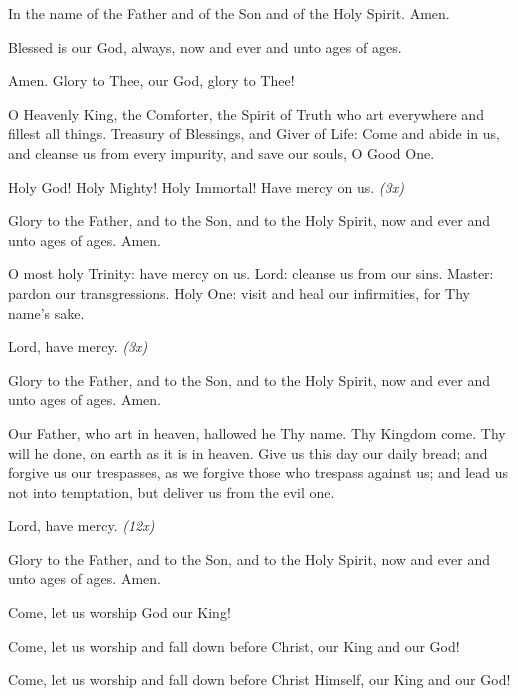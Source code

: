\begin{center}
\end{center}

In the name of the Father and of the Son and of the Holy Spirit. Amen.

\begin{hang}
\noindent{}Blessed is our God, always, now and ever and unto ages of ages.

\end{hang}

\begin{hang}
\noindent{}Amen. Glory to Thee, our God, glory to Thee!

O Heavenly King, the Comforter, the Spirit of Truth who art everywhere and fillest all things. Treasury of Blessings, and Giver of Life: Come and abide in us, and cleanse us from every impurity, and save our souls, O Good One.

Holy God! Holy Mighty! Holy Immortal! Have mercy on us. \textit{(3x)}

Glory to the Father, and to the Son, and to the Holy Spirit, now and ever and unto ages of ages. Amen.

O most holy Trinity: have mercy on us. Lord: cleanse us from our sins. Master: pardon our transgressions. Holy One: visit and heal our infirmities, for Thy name's sake.

Lord, have mercy. \textit{(3x)}

Glory to the Father, and to the Son, and to the Holy Spirit, now and ever and unto ages of ages. Amen.

Our Father, who art in heaven, hallowed he Thy name. Thy Kingdom come. Thy will he done, on earth as it is in heaven. Give us this day our daily bread; and forgive us our trespasses, as we forgive those who trespass against us; and lead us not into temptation, but deliver us from the evil one. 

Lord, have mercy. \textit{(12x)}

Glory to the Father, and to the Son, and to the Holy Spirit, now and ever and unto ages of ages. Amen.

Come, let us worship God our King!

Come, let us worship and fall down before Christ, our King and our God!

Come, let us worship and fall down before Christ Himself, our King and our God!

\end{hang}

